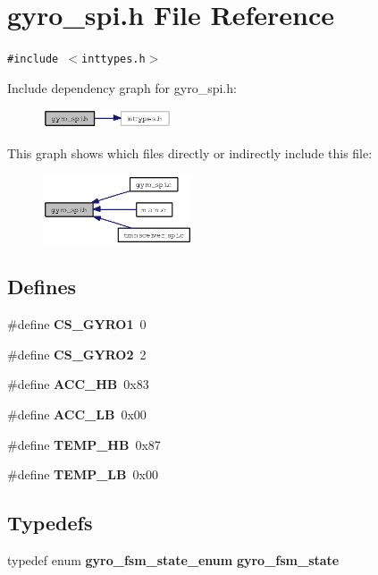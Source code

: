 \section{gyro\_\-spi.h File Reference}
\label{gyro__spi_8h}
{\tt \#include $<$inttypes.h$>$}\par


Include dependency graph for gyro\_\-spi.h:\begin{figure}[H]
\begin{center}
\leavevmode
\includegraphics[width=108pt]{gyro__spi_8h__incl}
\end{center}
\end{figure}


This graph shows which files directly or indirectly include this file:\begin{figure}[H]
\begin{center}
\leavevmode
\includegraphics[width=125pt]{gyro__spi_8h__dep__incl}
\end{center}
\end{figure}
\subsection*{Defines}
\begin{CompactItemize}
\item 
\#define {\bf CS\_\-GYRO1}~0
\item 
\#define {\bf CS\_\-GYRO2}~2
\item 
\#define {\bf ACC\_\-HB}~0x83
\item 
\#define {\bf ACC\_\-LB}~0x00
\item 
\#define {\bf TEMP\_\-HB}~0x87
\item 
\#define {\bf TEMP\_\-LB}~0x00
\end{CompactItemize}
\subsection*{Typedefs}
\begin{CompactItemize}
\item 
typedef enum {\bf gyro\_\-fsm\_\-state\_\-enum} {\bf gyro\_\-fsm\_\-state}
\end{CompactItemize}
